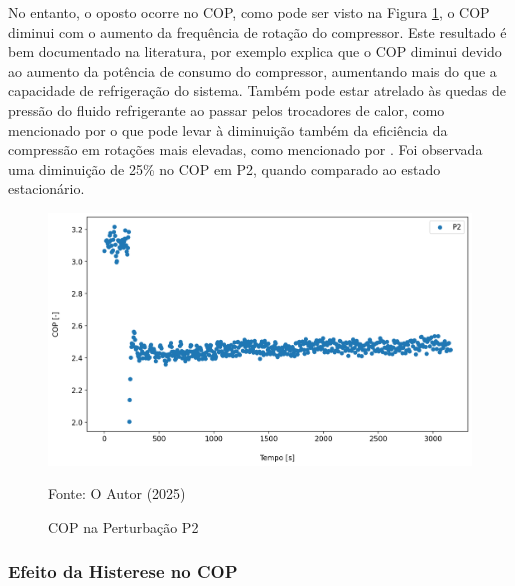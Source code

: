 No entanto, o oposto ocorre no COP, como pode ser visto na Figura \ref{fig:Análise do COP Rotação}, o COP diminui com o aumento da frequência de rotação do compressor. Este resultado é bem documentado na literatura, por exemplo \textcite{MASCHE2021302} explica que o COP diminui devido ao aumento da potência de consumo do compressor, aumentando mais do que a capacidade de refrigeração do sistema. Também pode estar atrelado às quedas de pressão do fluido refrigerante ao passar pelos trocadores de calor, como mencionado por \textcite{CONSTANTINO2022101048} o que pode levar à diminuição também da eficiência da compressão em rotações mais elevadas, como mencionado por \textcite{stoecker1998industrial}. Foi observada uma diminuição de 25\% no COP em P2, quando comparado ao estado estacionário.
\newpage
\begin{figure}[h]
    \centering
    \includegraphics[width=1\linewidth]{FigurasdoTexto/COP Perturbação Rot.png}
    \caption{COP na Perturbação P2}
    \label{fig:Análise do COP Rotação}
    {\footnotesize Fonte: O Autor (2025)}
\end{figure}

\subsubsection{Efeito da Histerese no COP}

